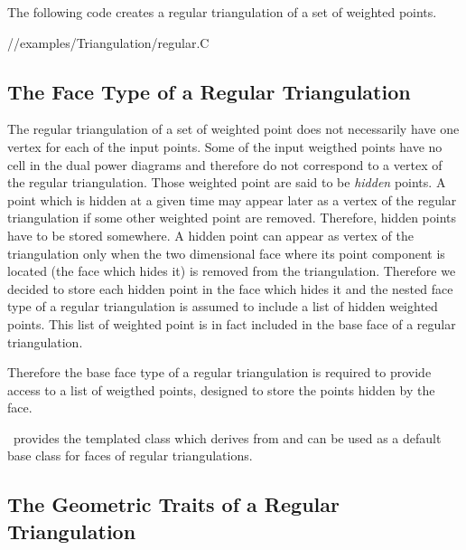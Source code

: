 


\ccExample
The following code  creates a regular triangulation 
of a set of weighted points.

//examples/Triangulation/regular.C


\subsection{The Face Type of a Regular Triangulation}

The regular triangulation of a set of weighted point does not
necessarily
have one vertex for each of the input points. Some of the input
weigthed points have no cell in the dual power diagrams
and therefore do not correspond to a vertex of the regular
triangulation.
Those weighted point are said to be {\it hidden} points.
A  point which is hidden at a given time may appear later as a vertex of
the regular triangulation if some other weighted point are removed.
Therefore, hidden points have to be stored somewhere.
A hidden point can appear as vertex of the triangulation
only when the
two dimensional face where its point component is located
(the face which hides it)
is removed from the triangulation. 
Therefore we decided to store each hidden point
in the face which  hides it and the nested face type of a 
regular triangulation is assumed to include a list of hidden 
weighted points. This list of weighted point is in fact included
in the base face of a regular triangulation.

Therefore the base face type of a regular triangulation
is required to provide access to a list of weigthed points,
designed to store the points hidden by the face.


\cgal\ provides the templated class 
which derives from 
and can be used as a default base class for faces of regular triangulations.



\subsection{The Geometric Traits of a Regular Triangulation}

